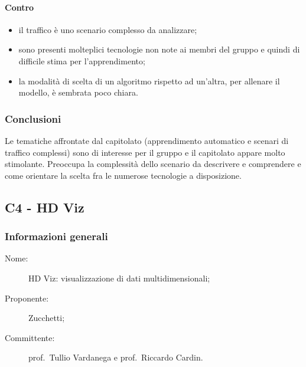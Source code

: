 \paragraph*{Contro}
\begin{itemize}
	\item il traffico è uno scenario complesso da analizzare;
	\item sono presenti molteplici tecnologie non note ai membri del gruppo e quindi di difficile stima per l'apprendimento;
	\item la modalità di scelta di un algoritmo rispetto ad un'altra, per allenare il modello, è sembrata poco chiara.
\end{itemize}
\subsubsection{Conclusioni}
Le tematiche affrontate dal capitolato (apprendimento automatico e scenari di traffico complessi) sono di interesse per il gruppo e il capitolato appare molto stimolante. Preoccupa la complessità dello scenario da descrivere e comprendere e come orientare la scelta fra le numerose tecnologie a disposizione.

\subsection{C4 - HD Viz}
\subsubsection{Informazioni generali}
\begin{description}
	\item[Nome:] HD Viz: visualizzazione di dati multidimensionali;
	\item[Proponente:] Zucchetti;
	\item[Committente:] prof.~Tullio Vardanega e prof.~Riccardo Cardin.
\end{description}
